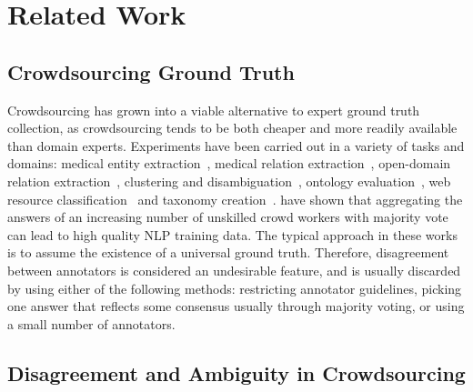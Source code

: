 \section{Related Work}
\label{sec:relatedwork}

\subsection{Crowdsourcing Ground Truth}

Crowdsourcing has grown into a viable alternative to expert ground truth collection, as crowdsourcing tends to be both cheaper and more readily available than domain experts. Experiments have been carried out in a variety of tasks and domains:  medical entity extraction~\cite{zhai2013web,Finin2010,van2012eu}, medical relation extraction~\cite{kilicoglu2011constructing,van2012eu}, open-domain relation extraction~\cite{kondreddi2014combining}, clustering and disambiguation~\cite{Lee2013}, ontology evaluation~\cite{noy2013mechanical}, web resource classification~\cite{castano2016human} and taxonomy creation~\cite{bragg2013crowdsourcing}. \cite{Snow2008} have shown that aggregating the answers of an increasing number of unskilled crowd workers with majority vote can lead to high quality NLP training data. The typical approach in these works is to assume the existence of a universal ground truth. Therefore, disagreement between annotators is considered an undesirable feature, and is usually discarded by using either of the following methods: restricting annotator guidelines, picking one answer that reflects some consensus usually through majority voting, or using a small number of annotators.


\subsection{Disagreement and Ambiguity in Crowdsourcing}

